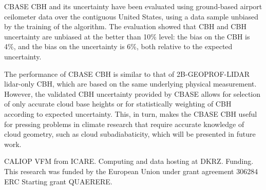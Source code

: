 \documentclass[essd,manuscript]{copernicus}\usepackage[]{graphicx}\usepackage[]{color}
\begin{document}
CBASE CBH and its uncertainty have been evaluated using
ground-based airport ceilometer data over the contiguous United States, using a
data sample unbiased by the training of the algorithm.  The evaluation showed that
CBH and CBH uncertainty are unbiased at the better
than 10\% level: the bias on the CBH is %
4\%,
and the bias on the uncertainty is %
6\%, both relative to the expected uncertainty.

The performance of CBASE CBH is similar to that of
2B-GEOPROF-LIDAR lidar-only CBH, which are based on the same
underlying physical measurement.  However, the validated CBH
uncertainty provided by CBASE allows for selection of only accurate cloud base
heights or for statistically weighting of CBH according to 
expected uncertainty.  This, in turn, makes the CBASE CBH useful
for pressing problems in climate research that require accurate knowledge of
cloud geometry, such as cloud subadiabaticity, which will be presented in future
work. 

\begin{acknowledgements}
CALIOP VFM from ICARE.  Computing and data hosting at DKRZ.  Funding. This
research was funded by the European Union  under grant agreement 306284 ERC Starting grant QUAERERE. 
\end{acknowledgements}

\end{document}
